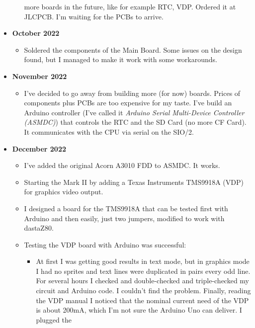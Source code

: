 \documentclass[a4paper,11pt]{article}
\begin{document}
\begin{itemize}
\begin{itemize}
            more boards in the future, like for example RTC, VDP. Ordered it at
            JLCPCB. I'm waiting for the PCBs to arrive.
        \end{itemize}
        \item \textbf{October 2022}
        \begin{itemize}
            \item Soldered the components of the Main Board. Some issues on the
            design found, but I managed to make it work with some workarounds.
        \end{itemize}
        \item \textbf{November 2022}
        \begin{itemize}
            \item I've decided to go away from building more (for now) boards.
            Prices of components plus PCBs are too expensive for my taste. I've
            build an Arduino controller (I've called it \textit{Arduino Serial
            Multi-Device Controller (ASMDC)}) that controls the RTC and the SD
            Card (no more CF Card). It communicates with the CPU via serial on
            the SIO/2.
        \end{itemize}
        \item \textbf{December 2022}
        \begin{itemize}
            \item I've added the original Acorn A3010 FDD to ASMDC. It works.
            \item Starting the Mark II by adding a Texas Instruments TMS9918A
            (VDP) for graphics video output.
            \item I designed a board for the TMS9918A that can be tested first
            with Arduino and then easily, just two jumpers, modified to work
            with dastaZ80.
            \item Testing the VDP board with Arduino was successful: 
            \begin{itemize}
                \item At first I was getting good results in text mode, but in
                graphics mode I had no sprites and text lines were duplicated in
                pairs every odd line. For several hours I checked and
                double-checked and triple-checked my circuit and Arduino code.
                I couldn't find the problem. Finally, reading the VDP manual I
                noticed that the nominal current need of the VDP is about 200mA,
                which I'm not sure the Arduino Uno can deliver. I plugged the

\end{itemize}
\end{itemize}
\end{itemize}
\end{document}
